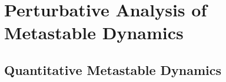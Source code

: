 \begin{comment}
\begin{proof}
Fix $x,y\in C_k$. We first consider the case $z\in C_k$.

Since $X^\ep$ is recurrent, $\tau_{C_k,n}^\ep<\infty$ almost surely for all $n\in\NN$ so that the reduced chain $\tilde{X}^{k,\ep}$ is well-defined on $C_k$. As transitions outside $C_k$ do not affect the event $\{\bar{\tau}_y^\ep < \bar{\tau}_z^\ep\}$, it holds that
\begin{equation*}
\zeta^\ep(x):=\PP_x(\bar{\tau}_y^\ep < \bar{\tau}_z^\ep) = \PP_x(\tilde{\tau}_y^{k,\ep} < \tilde{\tau}_z^{k,\ep}).
\end{equation*}
Due to Theorem \ref{thm:complement}, the forward equation for $\zeta^\ep$ can then be written as
\begin{equation*}
\zeta^\ep(x) = \sum_{w\in C_k\setminus\{y,z\}} s_{kk}^\ep(w|x) \zeta^\ep(w) + s_{kk}^\ep(y|x).
\end{equation*}
Substituting $\ep=0$ and subtracting both sides, it follows that
\begin{align*}
&|\zeta^\ep(x) - \zeta^0(x)|\\
&\le \sum_{w\in C_k\setminus\{y,z\}} |s_{kk}^\ep(w|x) - p^0(w|x)| \zeta^\ep(w) + \sum_{w\in C_k\setminus\{y,z\}} p^0(w|x)|\zeta^\ep(w)-\zeta^0(w)| + |s_{kk}^\ep(y|x) - p^0(y|x)|\\
&\le \sum_{w\in C_k\setminus\{z\}} |s_{kk}^\ep(w|x) - p^0(w|x)|+ \sum_{w\in C_k\setminus\{y,z\}} p^0(w|x)|\zeta^\ep(w)-\zeta^0(w)|\\
&\le \norm{\bS_{kk}^\ep - \bP_{kk}^\ep}_{1,\infty} + \norm{\bP_{kk}^\ep - \bP_{kk}^0}_{1,\infty} + (1-p^0(y|x)-p^0(z|x)) \norm{\zeta^\ep-\zeta^0}_\infty\\
&\le d_{\out}\ep + n_{\out}\ep + \left(1-\frac{q}{|C_k|}\right) \norm{\zeta^\ep-\zeta^0}_\infty.
\end{align*}
Hence we obtain $\norm{\zeta^\ep-\zeta^0}_\infty \le q^{-1}|C_k|(d_{\out}+n_{\out})\ep$.
\end{proof}
\end{comment}


\section{Perturbative Analysis of Metastable Dynamics}\label{app:perturb}


\subsection{Quantitative Metastable Dynamics}

